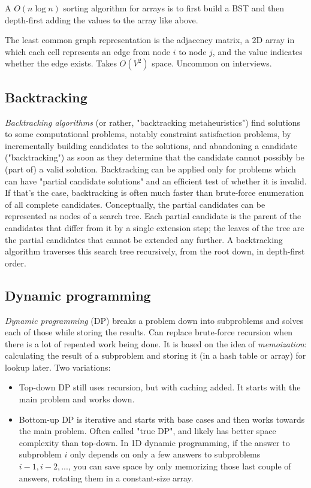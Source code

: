 \documentclass[8pt, table, xcdraw]{article}%
\begin{document}
A $O(n \log n)$ sorting algorithm for arrays is to first build a BST and then depth-first adding the values to the array like above.

The least common graph representation is the adjacency matrix, a 2D array in which each cell represents an edge from node $i$ to node $j$, and the value indicates whether the edge exists. Takes $O(V^2)$ space. Uncommon on interviews.

\subsection{Backtracking}

\emph{Backtracking algorithms} (or rather, "backtracking metaheuristics") find solutions to some computational problems, notably constraint satisfaction problems, by incrementally building candidates to the solutions, and abandoning a candidate ("backtracking") as soon as they determine that the candidate cannot possibly be (part of) a valid solution. Backtracking can be applied only for problems which can have "partial candidate solutions" and an efficient test of whether it is invalid. If that's the case, backtracking is often much faster than brute-force enumeration of all complete candidates. Conceptually, the partial candidates can be represented as nodes of a search tree. Each partial candidate is the parent of the candidates that differ from it by a single extension step; the leaves of the tree are the partial candidates that cannot be extended any further. A backtracking algorithm traverses this search tree recursively, from the root down, in depth-first order.

\subsection{Dynamic programming}

\emph{Dynamic programming} (DP) breaks a problem down into subproblems and solves each of those while storing the results. Can replace brute-force recursion when there is a lot of repeated work being done. It is based on the idea of \emph{memoization}: calculating the result of a subproblem and storing it (in a hash table or array) for lookup later. Two variations:

\begin{itemize}
    \item Top-down DP still uses recursion, but with caching added. It starts with the main problem and works down.
    \item Bottom-up DP is iterative and starts with base cases and then works towards the main problem. Often called "true DP", and likely has better space complexity than top-down. In 1D dynamic programming, if the answer to subproblem $i$ only depends on only a few answers to subproblems $i-1, i-2, ...$, you can save space by only memorizing those last couple of answers, rotating them in a constant-size array.
\end{itemize}
\end{document}
